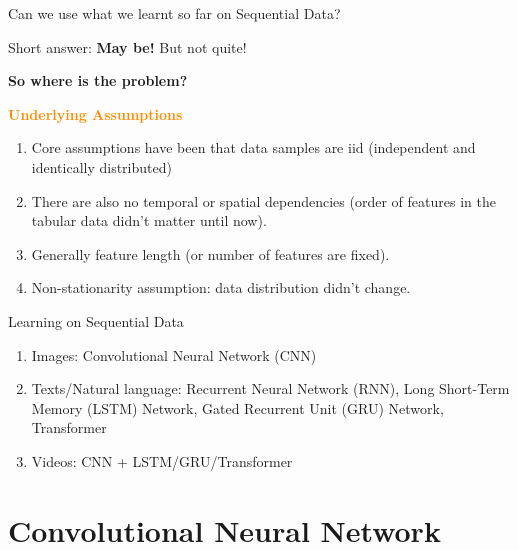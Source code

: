\documentclass[aspectratio=169,xcolor=dvipsnames,svgnames,x11names,fleqn]{beamer}
\begin{document}
\begin{frame}{Can we use what we learnt so far on Sequential Data?}

Short answer: \textbf{May be!} But not quite!

\vspace{20pt}

{{\textbf{So where is the problem?}}}

\vspace{20pt}


\textbf{\textcolor{DarkOrange}{Underlying Assumptions}}

\vspace{20pt}



\begin{enumerate}
\item Core assumptions have been that data samples are iid (independent and identically distributed)

\item There are also no temporal or spatial dependencies (order of features in the tabular data didn't matter until now).

\item Generally feature length (or number of features are fixed).

\item Non-stationarity assumption: data distribution didn't change.

\end{enumerate}

\end{frame}



\begin{frame}{Learning on Sequential Data}


\begin{enumerate}

\item Images: Convolutional Neural Network (CNN)

\item Texts/Natural language: Recurrent Neural Network (RNN), Long Short-Term Memory (LSTM) Network, Gated Recurrent Unit (GRU) Network, Transformer
\item Videos: CNN + LSTM/GRU/Transformer

\end{enumerate}

\end{frame}


\section{Convolutional Neural Network}
\end{document}

